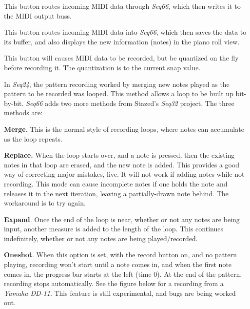    This button routes incoming MIDI data through
   \textsl{Seq66}, which then writes it to the MIDI output buss.

   This button routes incoming MIDI data into
   \textsl{Seq66}, which then saves the data to its buffer, and also
   displays the new information (notes) in the piano roll view.

   This button will causes MIDI data to be recorded, but be
   quantized on the fly before recording it.
   The quantization is to the current snap value.

   In \textsl{Seq24}, the pattern recording worked by merging new notes played
   as the pattern to be recorded was looped.  This method allows a loop to be
   built up bit-by-bit.  \textsl{Seq66} adds two more methods from
   Stazed's \textsl{Seq32} project.  The three methods are:

   \begin{enumber}
      \item \textbf{Merge}.
         This is the normal style of recording loops, where notes can
         accumulate as the loop repeats.
      \item \textbf{Replace.}
         When the loop starts over, and a note is pressed,
         then the existing notes in that loop are erased,
         and the new note is added.
         This provides a good way of correcting major mistakes, live.
         It will not work if adding notes while not recording.
         This mode can cause incomplete notes if one
         holds the note and releases it in the next iteration, leaving a
         partially-drawn note behind.  The workaround is to try again.
      \item \textbf{Expand}.
         Once the end of the loop is near, whether or
         not any notes are being input, another measure is added to the length
         of the loop.
         This continues indefinitely, whether or not any notes are
         being played/recorded.
      \item \textbf{Oneshot}.
         When this option is set, with the record button on, and no pattern
         playing, recording won't start until a note comes in, and when the
         first note comes in, the progress bar starts at the left (time 0).  At
         the end of the pattern, recording stops automatically.  See the figure
         below for a recording from a \textsl{Yamaha DD-11}.
         This feature is still experimental, and bugs are being worked out.
   \end{enumber}

